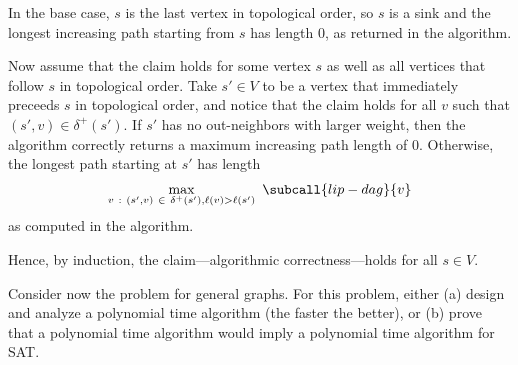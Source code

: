 \documentclass{article}
\begin{document}
\begin{solution}
\begin{subproof}[Correctness]
In the base case, \( s \) is the last vertex in topological order, so \( s \) is a sink and the longest increasing path starting from \( s \) has length 0, as returned in the algorithm.

Now assume that the claim holds for some vertex \( s \) as well as all vertices that follow \( s \) in topological order. Take \( s' \in V \) to be a vertex that immediately preceeds \( s \) in topological order, and notice that the claim holds for all \( v \) such that \( (s',v) \in \delta^{+}(s') \).
If \( s' \) has no out-neighbors with larger weight, then the algorithm correctly returns a maximum increasing path length of 0. Otherwise, the longest path starting at \( s' \) has length
\begin{align*}
    \max_{v \ : \ (s',v) \ \in \ \delta^{+}(s'), \ell(v) > \ell(s')} \ \subcall{lip-dag}{v}
\end{align*}
as computed in the algorithm.

Hence, by induction, the claim---algorithmic correctness---holds for all \( s \in V \).

\end{subproof}

\end{solution}
\pagebreak





\begin{subexercise}
  Consider now the problem for general graphs. For this problem, either (a) design and analyze a polynomial time algorithm (the faster the better), or (b) prove that a polynomial time algorithm would imply a polynomial time algorithm for SAT.
\end{subexercise}
\end{document}
